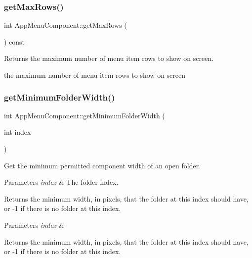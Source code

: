 \subsubsection{\texorpdfstring{get\+Max\+Rows()}{getMaxRows()}}
{\footnotesize\ttfamily int App\+Menu\+Component\+::get\+Max\+Rows (\begin{DoxyParamCaption}{ }\end{DoxyParamCaption}) const\hspace{0.3cm}{\ttfamily [protected]}}

\begin{DoxyReturn}{Returns}
the maximum number of menu item rows to show on screen.

the maximum number of menu item rows to show on screen 
\end{DoxyReturn}
\mbox{\label{classAppMenuComponent_a454aa10ad1fe085dce2e960dd810c8e4}} 
\subsubsection{\texorpdfstring{get\+Minimum\+Folder\+Width()}{getMinimumFolderWidth()}}
{\footnotesize\ttfamily int App\+Menu\+Component\+::get\+Minimum\+Folder\+Width (\begin{DoxyParamCaption}\item[{int}]{index }\end{DoxyParamCaption})\hspace{0.3cm}{\ttfamily [protected]}}

Get the minimum permitted component width of an open folder.


\begin{DoxyParams}{Parameters}
{\em index} & The folder index.\\
\hline
\end{DoxyParams}
\begin{DoxyReturn}{Returns}
the minimum width, in pixels, that the folder at this index should have, or -\/1 if there is no folder at this index.
\end{DoxyReturn}

\begin{DoxyParams}{Parameters}
{\em index} & \\
\hline
\end{DoxyParams}
\begin{DoxyReturn}{Returns}
the minimum width, in pixels, that the folder at this index should have, or -\/1 if there is no folder at this index. 
\end{DoxyReturn}
\mbox{\label{classAppMenuComponent_aa42fbf211b823e0fe37f531caea7f148}} 
